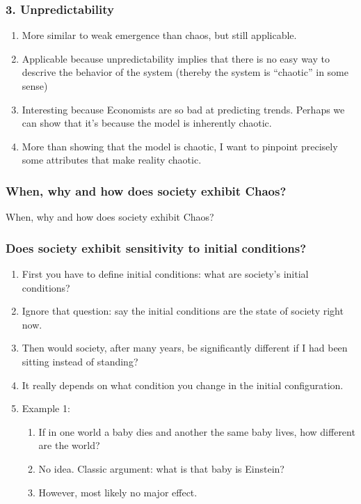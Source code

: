 \documentclass[11pt, handout]{beamer}
\begin{document}
\begin{frame}
    \frametitle{3. Unpredictability}
        \begin{enumerate}
            \item More similar to weak emergence than chaos, but still applicable.
            \item Applicable because unpredictability implies that there is no easy way to descrive the behavior of the system (thereby the system is ``chaotic'' in some sense)
            \item Interesting because Economists are so bad at predicting trends. Perhaps we can show that it's because the model is inherently chaotic.
            \item More than showing that the model is chaotic, I want to pinpoint precisely some attributes that make reality chaotic.
        \end{enumerate}
\end{frame}

\begin{frame}
    \frametitle{When, why and how does society exhibit Chaos?}
    When, why and how does society exhibit Chaos?
\end{frame}

\begin{frame}
    \frametitle{Does society exhibit sensitivity to initial conditions?}
    \begin{enumerate}
        \item First you have to define initial conditions: what are society's initial conditions?
        \item Ignore that question: say the initial conditions are the state of society right now.
        \item Then would society, after many years, be significantly different if I had been sitting instead of standing?
        \item It really depends on what condition you change in the initial configuration.
        \item Example 1: 
            \begin{enumerate}
                \item If in one world a baby dies and another the same baby lives, how different are the world?
                \item No idea. Classic argument: what is that baby is Einstein?
                \item However, most likely no major effect.
            \end{enumerate}
    \end{enumerate}
\end{frame}
\end{document}
